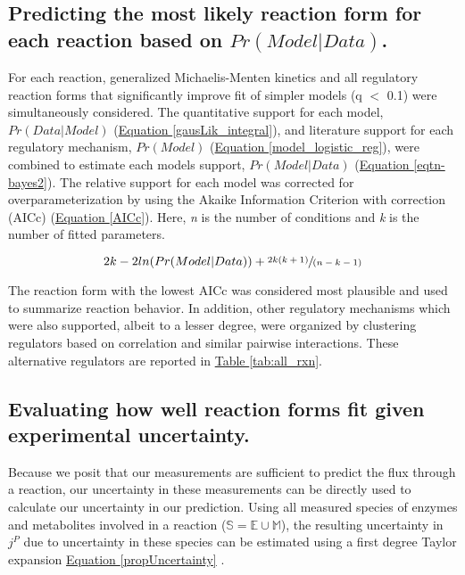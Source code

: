 \subsection*{Predicting the most likely reaction form for each reaction based on $Pr(Model | Data)$.}

For each reaction, generalized Michaelis-Menten kinetics and all regulatory reaction forms that significantly improve fit of simpler models (q $<$ 0.1) were simultaneously considered. The quantitative support for each model, $Pr(Data | Model)$ (\hyperref[gausLik_integral]{Equation \ref{gausLik_integral}}), and literature support for each regulatory mechanism, $Pr(Model)$ (\hyperref[model_logistic_reg]{Equation \ref{model_logistic_reg}}), were combined to estimate each models support, $Pr(Model | Data)$ (\hyperref[eqtn-bayes2]{Equation \ref{eqtn-bayes2}}). The relative support for each model was corrected for overparameterization by using the Akaike Information Criterion with correction (AICc) (\hyperref[AICc]{Equation \ref{AICc}}). Here, \textit{n} is the number of conditions and \textit{k} is the number of fitted parameters.

\begin{equation}
2k - 2ln(Pr(Model | Data)) + \sfrac{2k(k+1)}{(n-k-1)}\label{AICc}
\end{equation}

The reaction form with the lowest AICc was considered most plausible and used to summarize reaction behavior.  In addition, other regulatory mechanisms which were also supported, albeit to a lesser degree, were organized by clustering regulators based on correlation and similar pairwise interactions.  These alternative regulators are reported in \hyperref[tab:all_rxn]{Table \ref{tab:all_rxn}}.

\subsection*{Evaluating how well reaction forms fit given experimental uncertainty.\label{simmer_delta}}

Because we posit that our measurements are sufficient to predict the flux through a reaction, our uncertainty in these measurements can be directly used to calculate our uncertainty in our prediction. Using all measured species of enzymes and metabolites involved in a reaction ($\mathbb{S} = \mathbb{E} \cup \mathbb{M}$), the resulting uncertainty in $j^{P}$ due to uncertainty in these species can be estimated using a first degree Taylor expansion \hyperref[propUncertainty]{Equation \ref{propUncertainty}} \cite{Lynch:1998vx}.

